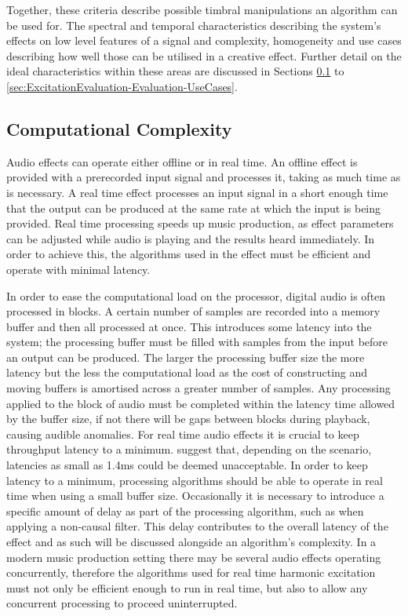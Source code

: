 	Together, these criteria describe possible timbral manipulations an algorithm can be used for. The spectral and
	temporal characteristics describing the system's effects on low level features of a signal and complexity,
	homogeneity and use cases describing how well those can be utilised in a creative effect. Further detail on the
	ideal characteristics within these areas are discussed in Sections
	\ref{sec:ExcitationEvaluation-Evaluation-Complexity} to \ref{sec:ExcitationEvaluation-Evaluation-UseCases}.

	\subsection{Computational Complexity}
	\label{sec:ExcitationEvaluation-Evaluation-Complexity}
		Audio effects can operate either offline or in real time. An offline effect is provided with a prerecorded
		input signal and processes it, taking as much time as is necessary. A real time effect processes an input
		signal in a short enough time that the output can be produced at the same rate at which the input is being
		provided. Real time processing speeds up music production, as effect parameters can be adjusted while audio
		is playing and the results heard immediately. In order to achieve this, the algorithms used in the effect
		must be efficient and operate with minimal latency. 

		In order to ease the computational load on the processor, digital audio is often processed in blocks.  A
		certain number of samples are recorded into a memory buffer and then all processed at once. This introduces
		some latency into the system; the processing buffer must be filled with samples from the input before an
		output can be produced. The larger the processing buffer size the more latency but the less the
		computational load as the cost of constructing and moving buffers is amortised across a greater number of
		samples. Any processing applied to the block of audio must be completed within the latency time allowed by
		the buffer size, if not there will be gaps between blocks during playback, causing audible anomalies. For
		real time audio effects it is crucial to keep throughput latency to a minimum. \citet{lester2007the}
		suggest that, depending on the scenario, latencies as small as 1.4ms could be deemed unacceptable. In order
		to keep latency to a minimum, processing algorithms should be able to operate in real time when using a
		small buffer size.  Occasionally it is necessary to introduce a specific amount of delay as part of the
		processing algorithm, such as when applying a non-causal filter. This delay contributes to the overall
		latency of the effect and as such will be discussed alongside an algorithm's complexity.  In a modern music
		production setting there may be several audio effects operating concurrently, therefore the algorithms used
		for real time harmonic excitation must not only be efficient enough to run in real time, but also to allow
		any concurrent processing to proceed uninterrupted.

